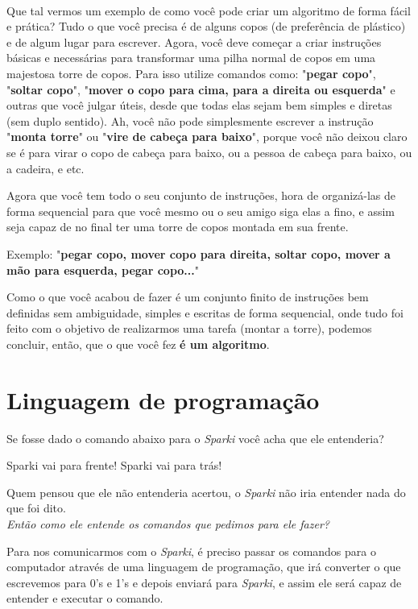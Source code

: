 \paragraph{}
Que tal vermos um exemplo de como você pode criar um algoritmo de forma fácil e prática? Tudo o que você precisa é de alguns copos (de preferência de plástico) e de algum lugar para escrever. Agora, você deve começar a criar instruções básicas e necessárias para transformar uma pilha normal de copos em uma majestosa torre de copos. Para isso utilize comandos como: "\textbf{pegar copo}", "\textbf{soltar copo}", "\textbf{mover o copo para cima, para a direita ou esquerda}" e outras que você julgar úteis, desde que todas elas sejam bem simples e diretas (sem duplo sentido). Ah, você não pode simplesmente escrever a instrução "\textbf{monta torre}" ou "\textbf{vire de cabeça para baixo}", porque você não deixou claro se é para virar o copo de cabeça para baixo, ou a pessoa de cabeça para baixo, ou a cadeira, e etc.

Agora que você tem todo o seu conjunto de instruções, hora de organizá-las de forma sequencial para que você mesmo ou o seu amigo siga elas a fino, e assim seja capaz de no final ter uma torre de copos montada em sua frente.

Exemplo: "\textbf{pegar copo, mover copo para direita, soltar copo, mover a mão para esquerda, pegar copo...}"

Como o que você acabou de fazer é um conjunto finito de instruções bem definidas sem ambiguidade, simples e escritas de forma sequencial, onde tudo foi feito com o objetivo de realizarmos uma tarefa (montar a torre), podemos concluir, então, que o que você fez \textbf{é um algoritmo}.

\section{Linguagem de programação}
    Se fosse dado o comando abaixo para o \textit{Sparki} você acha que ele entenderia? \par
    \begin{center}
    Sparki vai para frente! Sparki vai para trás!\ \par
    \end{center} \par
    Quem pensou que ele não entenderia acertou, o \textit{Sparki} não iria entender nada do que foi dito.\\
    
    \textit{Então como ele entende os comandos que pedimos para ele fazer?}\par
    Para nos comunicarmos com o \textit{Sparki}, é preciso passar os comandos para o computador através de uma linguagem de programação, que irá converter o que escrevemos para 0's e 1's e depois enviará para \textit{Sparki}, e assim ele será capaz de entender e executar o comando.
    
